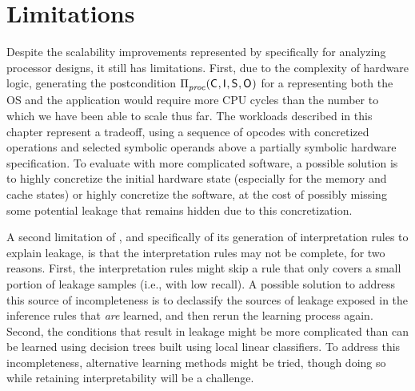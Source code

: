 \section{Limitations}
\label{dinome:sec:limitations}

\iffalse
\zz{runtime is limited by the solving time in SAT solver}
\zz{Current design cannot be scaled to unlimited number of CPU cycles.}
\zz{We cannot guarantee the compeleteness of the interference rules. Interpretable rules may skip the rule that only cover a small
portion of samples (i.e., with low recall). A possible solution is to
use the learned interference rule in declassification and run the
learning process again to get more coverage.}
\fi

Despite the scalability improvements represented by \thirdsysname
specifically for analyzing processor designs, it still has
limitations.  First, due to the complexity of hardware logic,
generating the postcondition $\Pi_{\mathit{proc}}^{}(\mathsf{C}_{},
\mathsf{I}_{}, \mathsf{S}_{}, \mathsf{O}_{})$ for a \proc representing both the OS
and the application would require more CPU cycles than the number to
which we have been able to scale \thirdsysname thus far.  The \thirdsysname
workloads described in this chapter represent a tradeoff, using a
sequence of opcodes with concretized operations and selected symbolic
operands above a partially symbolic hardware specification.  To
evaluate with more complicated software, a possible solution is to
highly concretize the initial hardware state (especially for the
memory and cache states) or highly concretize the software, at the
cost of possibly missing some potential leakage that remains hidden
due to this concretization.

A second limitation of \thirdsysname, and specifically of its generation of
interpretation rules to explain leakage, is that the interpretation
rules may not be complete, for two reasons.  First, the interpretation
rules might skip a rule that only covers a small portion of leakage
samples (i.e., with low recall).  A possible solution to address this
source of incompleteness is to declassify the sources of leakage
exposed in the inference rules that \textit{are} learned, and then
rerun the learning process again. Second, the conditions that result in
leakage might be more complicated than can be learned using decision
trees built using local linear classifiers.  To address this
incompleteness, alternative learning methods might be tried, though
doing so while retaining interpretability will be a challenge.


